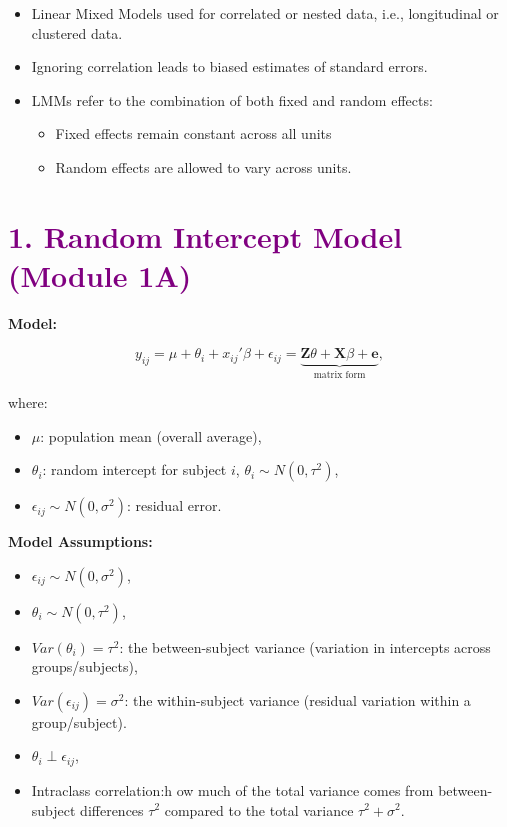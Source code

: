 \documentclass[
  letterpaper,
  DIV=11,
  numbers=noendperiod]{scrreprt}
\providecommand{\tightlist}{%
  \setlength{\itemsep}{0pt}\setlength{\parskip}{0pt}}\usepackage{longtable,booktabs,array}
\begin{document}
\markright{\textcolor{purple}{Overview}}

\begin{itemize}
\tightlist
\item
  Linear Mixed Models used for correlated or nested data, i.e.,
  longitudinal or clustered data.
\item
  Ignoring correlation leads to biased estimates of standard errors.
\item
  LMMs refer to the combination of both fixed and random effects:

  \begin{itemize}
  \tightlist
  \item
    Fixed effects remain constant across all units
  \item
    Random effects are allowed to vary across units.
  \end{itemize}
\end{itemize}

\hypertarget{section-3}{%
\section*{\texorpdfstring{\textcolor{purple}{1. Random Intercept Model (Module 1A)}}{}}\label{section-3}}

\markright{\textcolor{purple}{1. Random Intercept Model (Module 1A)}}

\textbf{Model:}

\[
y_{ij} = \mu + \theta_i + x_{ij}'\beta + \epsilon_{ij}
= \underbrace{\mathbf{Z}\theta + \mathbf{X}\beta + \mathbf{e}}_{\text{matrix form}},
\]

where:

\begin{itemize}
\tightlist
\item
  \(\mu\): population mean (overall average),
\item
  \(\theta_i\): random intercept for subject \(i\),
  \(\theta_i \sim N(0, \tau^2)\),
\item
  \(\epsilon_{ij} \sim N(0, \sigma^2)\): residual error.
\end{itemize}

\textbf{Model Assumptions:}

\begin{itemize}
\tightlist
\item
  \(\epsilon_{ij} \sim N(0, \sigma^2)\),
\item
  \(\theta_i \sim N(0, \tau^2)\),
\item
  \(Var(\theta_i) = \tau^2\): the between-subject variance (variation in
  intercepts across groups/subjects),
\item
  \(Var(\epsilon_{ij}) = \sigma^2\): the within-subject variance
  (residual variation within a group/subject).
\item
  \(\theta_i \perp \epsilon_{ij}\),
\item
  Intraclass correlation:h ow much of the total variance comes from
  between-subject differences \(\tau^2\) compared to the total variance
  \(\tau^2 + \sigma^2\).
\end{itemize}
\end{document}
